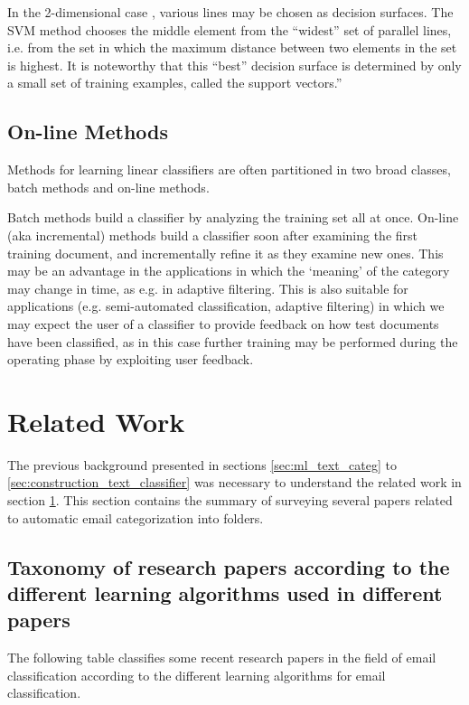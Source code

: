 In the 2-dimensional case , various lines may be chosen as decision surfaces. 
The SVM method chooses the middle element from the ``widest'' set of parallel 
lines, i.e. from the set in which the maximum distance between two elements in 
the set is highest. It is noteworthy that this ``best'' decision surface is 
determined by only a small set of training examples, called the support vectors.''\cite{Sebastiani2002}

\subsection{On-line Methods}
Methods for learning linear classifiers are often partitioned in two broad 
classes, batch methods and on-line methods.

Batch methods build a classifier by analyzing the training set all at once. 
On-line (aka incremental) methods build a classifier soon after examining 
the first training document, and incrementally refine it as they examine new ones. 
This may be an advantage in the applications in which the `meaning' of the 
category may change in time, as e.g. in adaptive filtering. This is also suitable 
for applications (e.g. semi-automated classification, adaptive filtering) in 
which we may expect the user of a classifier to provide feedback on how test 
documents have been classified, as in this case further training may be performed 
during the operating phase by exploiting user feedback.

\newpage
\section{Related Work}
\label{sec:related_work}
The previous background presented in sections \ref{sec:ml_text_categ} to \ref{sec:construction_text_classifier} was necessary to understand the related work in section \ref{sec:related_work}. This section contains the summary of surveying several papers related to automatic email categorization into folders.

\subsection{Taxonomy of research papers according to the different learning algorithms used in different papers}
The following table classifies some recent research papers in the field of email 
classification according to the different learning algorithms for email classification.

